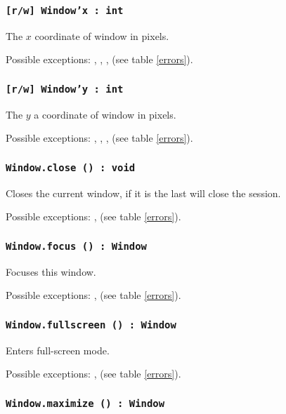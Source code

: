 \subsubsection{\texttt{[r/w] Window'x : int}}

The $x$ coordinate of window in pixels.

Possible exceptions: , , ,  (see table \ref{errors}).

\subsubsection{\texttt{[r/w] Window'y : int}}

The $y$ a coordinate of window in pixels.

Possible exceptions: , , ,  (see table \ref{errors}).

\subsubsection{\texttt{Window.close () : void}}

Closes the current window, if it is the last will close the session.

Possible exceptions: ,  (see table \ref{errors}).

\subsubsection{\texttt{Window.focus () : Window}}

Focuses this window.

Possible exceptions: ,  (see table \ref{errors}).

\subsubsection{\texttt{Window.fullscreen () : Window}}

Enters full-screen mode.

Possible exceptions: ,  (see table \ref{errors}).

\subsubsection{\texttt{Window.maximize () : Window}}

